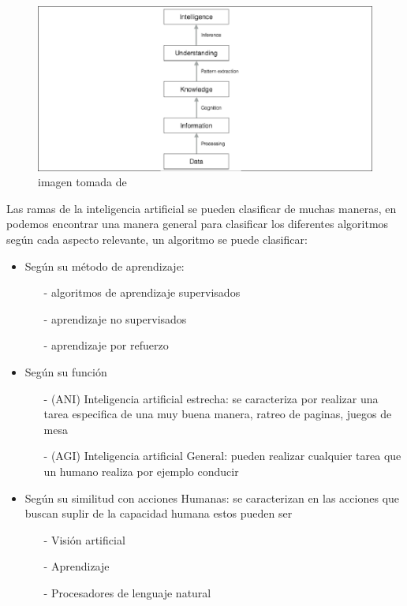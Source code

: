\begin{figure}[H]
    \centering
    \includegraphics[width=\linewidth]{bibliografia/Imagenes/InteligenceTransform.eps}
    \caption{imagen tomada de \cite{alberto_artasanchez_artificial_nodate}}
\end{figure}

Las ramas de la inteligencia artificial se pueden clasificar de muchas maneras, en \cite{alberto_artasanchez_artificial_nodate} podemos encontrar una manera general para clasificar los diferentes algoritmos según cada aspecto relevante, un algoritmo se puede clasificar:

\begin{itemize}
    \item Según su método de aprendizaje:
    \begin{itemize}
        \item [-]    algoritmos de aprendizaje supervisados
        \item [-]    aprendizaje no supervisados
        \item [-]    aprendizaje por refuerzo
    \end{itemize}
    \item Según su función
    \begin{itemize}
        \item [-] (ANI) Inteligencia artificial estrecha: se caracteriza por realizar una tarea especifica de una muy buena manera, ratreo de paginas, juegos de mesa
        \item [-] (AGI) Inteligencia artificial General: pueden realizar cualquier tarea que un humano realiza por ejemplo conducir
    \end{itemize}
    \item Según su similitud con acciones Humanas: se caracterizan en las acciones que buscan suplir de la capacidad humana estos pueden ser 
    \begin{itemize}
        \item [-] Visión artificial
        \item [-] Aprendizaje
        \item [-] Procesadores de lenguaje natural
    \end{itemize}
\end{itemize}


